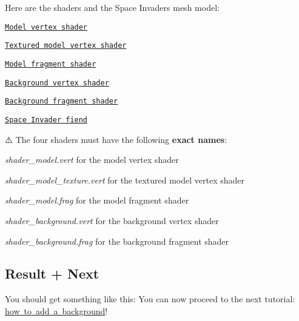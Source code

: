 Here are the shaders and the Space Invaders mesh model\+:
\begin{DoxyItemize}
\item \href{https://github.com/robotology/superimpose-mesh-lib/blob/master/doc/tutorial_code/shader_model.vert}{\tt Model vertex shader}
\item \href{https://github.com/robotology/superimpose-mesh-lib/blob/master/doc/tutorial_code/shader_model_texture.vert}{\tt Textured model vertex shader}
\item \href{https://github.com/robotology/superimpose-mesh-lib/blob/master/doc/tutorial_code/shader_model.frag}{\tt Model fragment shader}
\item \href{https://github.com/robotology/superimpose-mesh-lib/blob/master/doc/tutorial_code/shader_background.vert}{\tt Background vertex shader}
\item \href{https://github.com/robotology/superimpose-mesh-lib/blob/master/doc/tutorial_code/shader_background.frag}{\tt Background fragment shader}
\item \href{https://github.com/robotology/superimpose-mesh-lib/blob/master/doc/tutorial_code/spaceinvader.obj}{\tt Space Invader fiend}
\end{DoxyItemize}

⚠️ The four shaders must have the following {\bfseries exact names}\+:
\begin{DoxyItemize}
\item {\itshape shader\+\_\+model.\+vert} for the model vertex shader
\item {\itshape shader\+\_\+model\+\_\+texture.\+vert} for the textured model vertex shader
\item {\itshape shader\+\_\+model.\+frag} for the model fragment shader
\item {\itshape shader\+\_\+background.\+vert} for the background vertex shader
\item {\itshape shader\+\_\+background.\+frag} for the background fragment shader
\end{DoxyItemize}

\subsection*{Result + Next}





You should get something like this\+:  You can now proceed to the next tutorial\+: \mbox{\hyperlink{tutorial_superimpose_background}{how to add a background}}! 